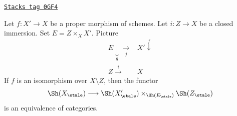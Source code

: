 \begin{lemma}
\label{etale-cohomology-lemma-glue-etale-sheaf-modification}
\href{https://stacks.math.columbia.edu/tag/0GF4}{\texttt{Stacks tag 0GF4}}

Let $f : X' \to X$ be a proper morphism of schemes. Let $i : Z \to X$
be a closed immersion. Set $E = Z \times_X X'$. Picture
$$
\begin{array}{cc}E \underset{g}{\downarrow}\underset{j}{\longrightarrow} & X' \overset{f}{\downarrow} \\ Z \overset{i}{\longrightarrow} & X\end{array}
$$
If $f$ is an isomorphism over $X \setminus Z$, then the functor
$$
\Sh(X_\etale)
\longrightarrow
\Sh(X'_\etale) \times_{\Sh(E_\etale)} \Sh(Z_\etale)
$$
is an equivalence of categories.
\end{lemma}

